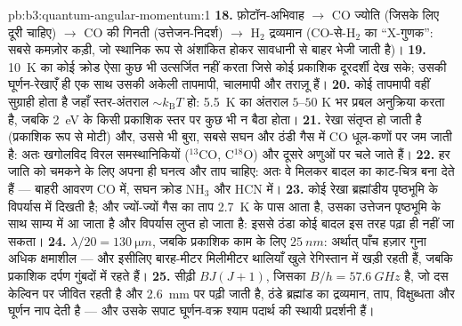 \begin{solution}{pb:b3:quantum-angular-momentum:1}
\textbf{18.} फ़ोटॉन-अभिवाह $\to$ CO ज्योति (जिसके लिए दूरी चाहिए)
$\to$ CO की गिनती (उत्तेजन-निदर्श) $\to$ H$_2$ द्रव्यमान
(CO-से-H$_2$ का ``X-गुणक'': सबसे कमज़ोर कड़ी, जो स्थानिक रूप से
अंशांकित होकर सावधानी से बाहर भेजी जाती है)।
\textbf{19.} \qty{10}{K} का कोई क्रोड ऐसा कुछ भी उत्सर्जित नहीं करता
जिसे कोई प्रकाशिक दूरदर्शी देख सके; उसकी घूर्णन-रेखाएँ ही एक साथ उसकी
अकेली तापमापी, चालमापी और तराज़ू हैं।
\textbf{20.} कोई तापमापी वहीं सुग्राही होता है जहाँ स्तर-अंतराल $\sim
k_{\text{B}}T$ हो: \qty{5.5}{K} का अंतराल
$5$--$50$ K भर प्रबल अनुक्रिया करता है, जबकि \qty{2}{eV} के किसी
प्रकाशिक स्तर पर कुछ भी न बैठा होता।
\textbf{21.} रेखा संतृप्त हो जाती है (प्रकाशिक रूप से मोटी) और, उससे
भी बुरा, सबसे सघन और ठंडी गैस में CO धूल-कणों पर जम जाती है: अतः
खगोलविद विरल समस्थानिकियों ($^{13}$CO, C$^{18}$O)
और दूसरे अणुओं पर चले जाते हैं।
\textbf{22.} हर जाति को चमकने के लिए अपना ही घनत्व और ताप चाहिए:
अतः वे मिलकर बादल का काट-चित्र बना देते हैं --- बाहरी आवरण CO में,
सघन क्रोड NH$_3$ और HCN में।
\textbf{23.} कोई रेखा ब्रह्मांडीय पृष्ठभूमि के विपर्यास में दिखती है;
और ज्यों-ज्यों गैस का ताप \qty{2.7}{K} के पास आता है, उसका
उत्तेजन पृष्ठभूमि के साथ साम्य में आ जाता है और विपर्यास
लुप्त हो जाता है: इससे ठंडा कोई बादल इस तरह पढ़ा ही नहीं जा सकता।
\textbf{24.} $\lambda/20 = \qty{130}{\micro m}$, जबकि प्रकाशिक काम
के लिए $\qty{25}{nm}$: अर्थात् पाँच हज़ार गुना अधिक
क्षमाशील --- और इसीलिए बारह-मीटर मिलीमीटर थालियाँ खुले रेगिस्तान में
खड़ी रहती हैं, जबकि प्रकाशिक दर्पण गुंबदों में रहते हैं।
\textbf{25.} सीढ़ी $BJ(J+1)$, जिसका $B/h = \qty{57.6}{GHz}$ है, जो
दस केल्विन पर जीवित रहती है और \qty{2.6}{mm} पर पढ़ी जाती है, ठंडे
ब्रह्मांड का द्रव्यमान, ताप, विक्षुब्धता और घूर्णन नाप देती है ---
और उसके सपाट घूर्णन-वक्र श्याम पदार्थ की स्थायी प्रदर्शनी हैं।
\end{solution}
